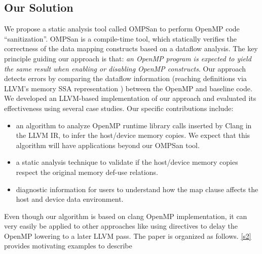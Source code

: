 \subsection{Our Solution}
We propose a static analysis 
tool called OMPSan to perform OpenMP code ``sanitization''.
OMPSan is a compile-time tool, which statically verifies  
the correctness of the  data mapping constructs based on a dataflow analysis.
The key principle guiding our approach is that: {\em an OpenMP program is expected to yield the same result when enabling
or disabling OpenMP constructs}.
Our approach detects errors by comparing the 
dataflow information (reaching definitions via
LLVM's memory SSA representation \cite{llvm-memoryssa-url}) 
between the OpenMP and baseline code.  We developed an
LLVM-based implementation of our approach and evaluated its
effectiveness using several case studies.
Our specific contributions include:
\begin{itemize}
\item an algorithm to analyze OpenMP runtime library calls inserted by Clang in the LLVM IR, to infer the host/device memory copies. We expect 
that this algorithm will have applications beyond our OMPSan tool. 
\item a static analysis technique to validate if the host/device memory copies respect the original memory def-use relations. 
\item diagnostic information for users to understand how the map clause affects the 
host and device data environment. 
\end{itemize}
Even though our algorithm is based on clang OpenMP implementation, 
it can very easily be applied to other approaches like using directives 
to delay the OpenMP lowering to a later LLVM pass.  
The paper is organized as follows. 
\autoref{s2} provides motivating examples to describe 
